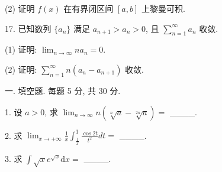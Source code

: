 \documentclass{examcollection}
\begin{document}
{\begin{minipage}{\textwidth}
(2) 证明 $f(x)$ 在有界闭区间 $[a, b]$ 上黎曼可积.\par
17. 已知数列 $\{a_{n}\}$ 满足 $a_{n+1} > a_{n} > 0$, 且 $\sum_{n=1}^{\infty} a_{n}$ 收敛.\par
(1) 证明: $\lim_{n\to \infty}na_n = 0.$\par
(2) 证明: $\sum_{n=1}^{\infty} n(a_n - a_{n+1})$ 收敛.\par
{}\smallskip
一. 填空题. 每题 5 分, 共 30 分.\par
1. 设 $a > 0$, 求 $\lim_{n \to \infty} n(\sqrt[n]{a} - \sqrt[2n]{a}) =$ \_\_\_\_.\par
2. 求  $\lim_{x\to+\infty}\frac{1}{x}\int_{\frac{1}{x}}^{1}\frac{\cos2t}{t^{2}}dt=$  \_\_\_\_.\par
3. 求 $\int \sqrt{x} e^{\sqrt{x}} \mathrm{d}x =$ \_\_\_\_.\par
\end{minipage}}
\ifdim\dimexpr\ht\proofbox+\dp\proofbox\relax>\textheight
\noindent\resizebox{!}{\textheight}{\usebox{\proofbox}}\else\noindent\usebox{\proofbox}\fi\clearpage
\end{document}
